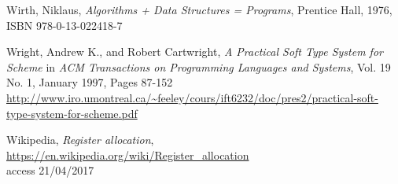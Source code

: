 \begin{thebibliography}{90}
  Wirth, Niklaus,
  \emph{Algorithms + Data Structures = Programs},
  Prentice Hall, 1976,
  ISBN 978-0-13-022418-7

  Wright, Andrew K., and Robert Cartwright,
  \emph{A Practical Soft Type System for Scheme}
  in \emph{ACM Transactions on Programming Languages and Systems},
  Vol. 19 No. 1, January 1997, Pages 87-152 \\
  \url{http://www.iro.umontreal.ca/~feeley/cours/ift6232/doc/pres2/practical-soft-type-system-for-scheme.pdf}

  Wikipedia, \emph{Register allocation}, \\
  \url{https://en.wikipedia.org/wiki/Register_allocation} \\
  access 21/04/2017
  
\end{thebibliography}
